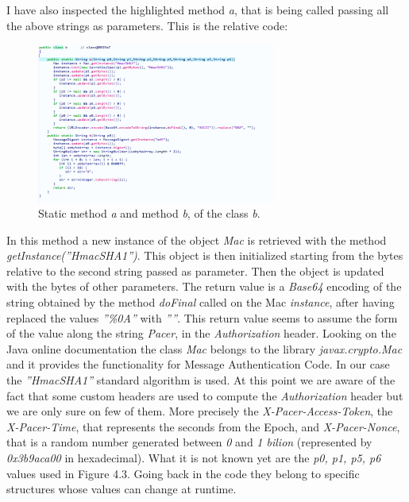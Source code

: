 			I have also inspected the highlighted method \textit{a}, that is being called passing all the above strings as parameters. This is the relative code:
			 \begin{figure}[ht]
				\centering
				\includegraphics[width=0.7\textwidth]{images/pacer_gda2.png}
				\caption{Static method \textit{a} and method \textit{b}, of the class \textit{b}.}
			\end{figure}
			\par In this method a new instance of the object \textit{Mac} is retrieved with the method \textit{getInstance(''HmacSHA1'')}. This object is then initialized starting from the bytes relative to the second string passed as parameter. Then the object is updated with the bytes of other parameters. The return value is a \textit{Base64} encoding of the string obtained by the method \textit{doFinal} called on the Mac \textit{instance}, after having replaced the values \textit{''\%0A''} with \textit{''''}. This return value seems to assume the form of the value along the string \textit{Pacer}, in the \textit{Authorization} header. \newline
			Looking on the Java online documentation the class \textit{Mac} belongs to the library \textit{javax.crypto.Mac} and it provides the functionality for Message Authentication Code. In our case the \textit{''HmacSHA1''} standard algorithm is used.\newline
			At this point we are aware of the fact that some custom headers are used to compute the \textit{Authorization} header but we are only sure on few of them. More precisely the \textit{X-Pacer-Access-Token}, the \textit{X-Pacer-Time}, that represents the seconds from the Epoch, and \textit{X-Pacer-Nonce}, that is a random number generated between \textit{0} and \textit{1 bilion} (represented by \textit{0x3b9aca00} in hexadecimal). What it is not known yet are the \textit{p0, p1, p5, p6} values used in Figure 4.3. Going back in the code they belong to specific structures whose values can change at runtime.  \newline
